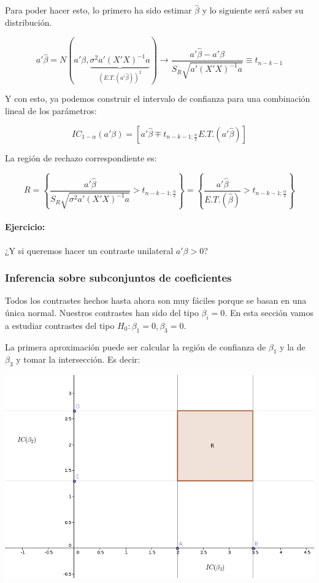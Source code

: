 Para poder hacer esto, lo primero ha sido estimar $\hat{β}$ y lo siguiente será saber su distribución.

\[a'\hat{β} = N\left(a'β,\underbrace{σ^2a'(X'X)^{-1}a}_{\left(E.T.(a'\hat{β})\right)^2}\right) \to \frac{a'\hat{β} - a'β}{S_R\sqrt{a'(X'X)^{-1}a}} \equiv t_{n-k-1}\]

Y con esto, ya podemos construir el intervalo de confianza para una combinación lineal de los parámetros:

\[
IC_{1-α}(a'β) = \left[ a'\hat{β} \mp t_{n-k-1;\frac{α}{2}}E.T.(a'\hat{β}) \right]
\]

La región de rechazo correspondiente es:

\[
R = \left\{ \frac{a'\hat{β}}{S_R\sqrt{σ^2a'(X'X)^{-1}a}} >  t_{n-k-1;\frac{α}{2}} \right\} = \left\{ \frac{a'\hat{β}}{E.T.(\hat{β})} >  t_{n-k-1;\frac{α}{2}} \right\}
\]

\paragraph{Ejercicio:} ¿Y si queremos hacer un contraste unilateral $a'β > 0$?

\subsubsection{Inferencia sobre subconjuntos de coeficientes}

Todos los contrastes hechos hasta ahora son muy fáciles porque se basan en una única normal. Nuestros contrastes han sido del tipo $β_i = 0$. En esta sección vamos a estudiar contrastes del tipo $H_0: β_1 = 0, β_3 = 0$.

La primera aproximación puede ser calcular la región de confianza de $β_1$ y la de $β_3$ y tomar la intersección. Es decir:

\begin{center}
\includegraphics[scale=0.5]{img/confianzamultivariantemal.png}
\end{center}

